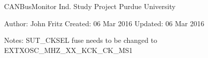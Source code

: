 C\+A\+N\+Bus\+Monitor Ind. Study Project Purdue University

Author\+: John Fritz Created\+: 06 Mar 2016 Updated\+: 06 Mar 2016

Notes\+: S\+U\+T\+\_\+\+C\+K\+S\+EL fuse needs to be changed to E\+X\+T\+X\+O\+S\+C\+\_\+M\+H\+Z\+\_\+\+X\+X\+\_\+K\+C\+K\+\_\+C\+K\+\_\+M\+S1 